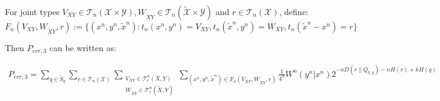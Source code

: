 \begin{lem}\label{lem: p_err3, F_n}
For joint types $V_{XY}\in \mathcal{T}_n(\mathcal{X}\times \mathcal{Y}), W_{\tilde{X}Y} \in \mathcal{T}_n(\tilde{\mathcal{X}}\times \mathcal{Y}) $ and $r\in \mathcal{T}_n(\mathcal{X})$, define:
\begin{equation*}
F_n(V_{XY},W_{\tilde{X}Y},r):=\{(x^n,y^n,\tilde{x}^n): t_n(x^n,y^n)=V_{XY}, t_n(\tilde{x}^n,y^n)=W_{XY}, t_n(\tilde{x}^n-x^n)=r \}
\end{equation*}

Then $P_{err,3}$ can be written as:

\begin{align} \label{equ: p_err3, F_n}
P_{err,3}=\sum_{q\in \tilde{S}_q}\sum_{r\in\mathcal{T}_n(\mathcal{X}) } \sum_{\substack{V_{XY}\in \mathcal{T}_\epsilon^n(X,Y)\\ W_{\tilde{X}Y}\in  \mathcal{T}_\epsilon^n(\tilde{X},Y) }} \sum_{(x^n,y^n,\tilde{x}^n)\in F_n(V_{XY},W_{\tilde{X}Y},r)}  \frac{1}{4^n} W^n(y^n|x^n)2^{-nD(r\| Q_{k,q})-nH(r)+kH(q)}
\end{align}

\end{lem}
